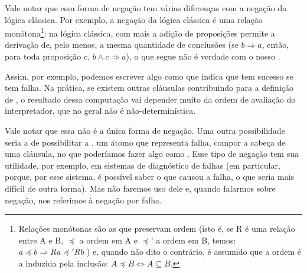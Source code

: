 \documentclass{article}
\begin{document}
Vale notar que essa forma de negação tem várias diferenças com a
negação da lógica clássica. Por exemplo, a negação da lógica clássica
é uma relação monótona\footnote{Relações monótonas são as que
  preservam ordem (isto é, se R é uma relação entre A e B, $\preceq$ a
  ordem em A e $\preceq$' a ordem em B, temos: $a \preceq b
  \Rightarrow Ra \preceq' Rb$ ) e, quando não dito o contrário, é
  assumido que a ordem é a induzida pela inclusão: $A \preceq B
  \Leftrightarrow A \subseteq B$.}: na lógica clássica, com mais a
adição de proposições permite a derivação de, pelo menos, a mesma
quantidade de conclusões (se $b \Rightarrow a$, então, para toda
proposição c, $b \wedge c \Rightarrow a$), o que segue não é verdade
com o nosso .

Assim, por exemplo, podemos escrever algo como 
que indica que  tem sucesso se  tem falha. Na
prática, se existem outras cláusulas contribuindo para a definição de
, o resultado dessa computação vai depender muito da ordem
de avaliação do interpretador, que no geral não é não-determinística.

Vale notar que essa não é a única forma de negação. Uma outra
possibilidade seria a de possibilitar a , um átomo que
representa falha, compor a cabeça de uma cláusula, no que poderíamos
fazer algo como .  Esse tipo de
negação tem sua utilidade, por exemplo, em sistemas de diagnóstico de
falhas (em particular, porque, por esse sistema, é possível saber o
que causou a falha, o que seria mais difícil de outra forma). Mas não
faremos uso dele e, quando falarmos sobre negação, nos referimos à
negação por falha.
\end{document}
